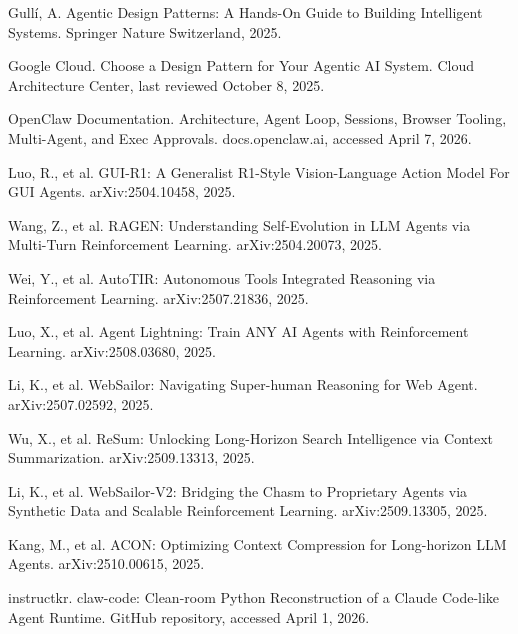 \documentclass[12pt,a4paper]{article}
\begin{document}
\begin{enumerate}[label={[\arabic*]}, resume]
    \item Gullí, A. Agentic Design Patterns: A Hands-On Guide to Building Intelligent Systems. Springer Nature Switzerland, 2025.

    \item Google Cloud. Choose a Design Pattern for Your Agentic AI System. Cloud Architecture Center, last reviewed October 8, 2025.

    \item OpenClaw Documentation. Architecture, Agent Loop, Sessions, Browser Tooling, Multi-Agent, and Exec Approvals. docs.openclaw.ai, accessed April 7, 2026.

    \item Luo, R., et al. GUI-R1: A Generalist R1-Style Vision-Language Action Model For GUI Agents. arXiv:2504.10458, 2025.

    \item Wang, Z., et al. RAGEN: Understanding Self-Evolution in LLM Agents via Multi-Turn Reinforcement Learning. arXiv:2504.20073, 2025.

    \item Wei, Y., et al. AutoTIR: Autonomous Tools Integrated Reasoning via Reinforcement Learning. arXiv:2507.21836, 2025.

    \item Luo, X., et al. Agent Lightning: Train ANY AI Agents with Reinforcement Learning. arXiv:2508.03680, 2025.

    \item Li, K., et al. WebSailor: Navigating Super-human Reasoning for Web Agent. arXiv:2507.02592, 2025.

    \item Wu, X., et al. ReSum: Unlocking Long-Horizon Search Intelligence via Context Summarization. arXiv:2509.13313, 2025.

    \item Li, K., et al. WebSailor-V2: Bridging the Chasm to Proprietary Agents via Synthetic Data and Scalable Reinforcement Learning. arXiv:2509.13305, 2025.

    \item Kang, M., et al. ACON: Optimizing Context Compression for Long-horizon LLM Agents. arXiv:2510.00615, 2025.

    \item instructkr. claw-code: Clean-room Python Reconstruction of a Claude Code-like Agent Runtime. GitHub repository, accessed April 1, 2026.
\end{enumerate}
\end{document}
